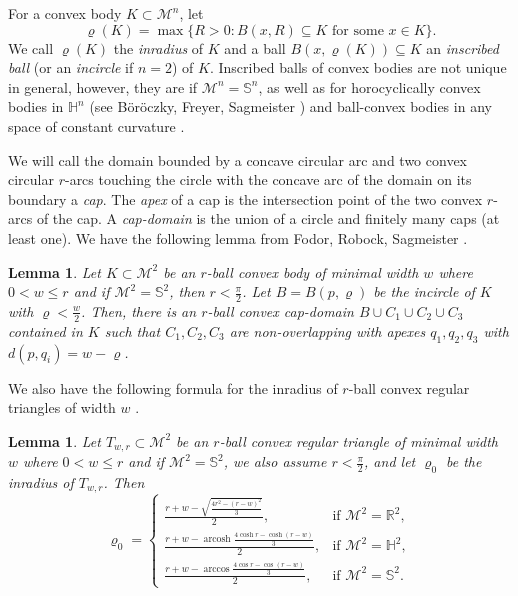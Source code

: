 \documentclass[12pt,reqno]{amsart}
\newtheorem{lemma}[theorem]{Lemma}
\theoremstyle{remark}
\newcommand{\R}{{\mathbb R}}
\newcommand{\hyp}{{\mathbb H}}
\newcommand{\sph}{{\mathbb S}}
\newcommand{\M}{\mathcal{M}}
\DeclareMathOperator{\arcosh}{\mathrm{arcosh}}
\begin{document}
For a convex body $K\subset\M^n$, let
$$
\varrho(K)=\max\{R>0\colon B(x,R)\subseteq K\text{ for some }x\in K\}.
$$
We call $\varrho(K)$ the \emph{inradius} of $K$ and a ball $B(x,\varrho(K))\subseteq K$ an \emph{inscribed ball} (or an \emph{incircle} if $n=2$) of $K$. Inscribed balls of convex bodies are not unique in general, however, they are if $\M^n=\sph^n$, as well as for horocyclically convex bodies in $\hyp^n$ (see B\"or\"oczky, Freyer, Sagmeister \cite{BoFS}) and ball-convex bodies in any space of constant curvature \cite{FRS26}. 

We will call the domain bounded by a concave circular arc and two convex circular $r$-arcs touching the circle with the concave arc of the domain on its boundary a \emph{cap}. The \emph{apex} of a cap is the intersection point of the two convex $r$-arcs of the cap. A \emph{cap-domain} is the union of a circle and finitely many caps (at least one). We have the following lemma from Fodor, Robock, Sagmeister \cite{FRS26}.

\begin{lemma}\label{lem:nonoverlapping}
Let $K\subset\M^2$ be an $r$-ball convex body of minimal width $w$ where $0<w\leq r$ and if $\M^2=\sph^2$, then $r<\frac{\pi}{2}$. Let $B=B(p,\varrho)$ be the incircle of $K$ with $\varrho<\frac{w}{2}$. Then, there is an $r$-ball convex cap-domain $B\cup C_1\cup C_2\cup C_3$ contained in $K$ such that $C_1,C_2,C_3$ are non-overlapping with apexes $q_1,q_2,q_3$ with $d(p,q_i)=w-\varrho$.
\end{lemma}

We also have the following formula for the inradius of $r$-ball convex regular triangles of width $w$ \cite{FRS26}.

\begin{lemma}\label{lem:rho0}
Let $T_{w,r}\subset\M^2$ be an $r$-ball convex regular triangle of minimal width $w$ where $0<w\leq r$ and if $\M^2=\sph^2$, we also assume $r<\frac{\pi}{2}$, and let $\varrho_0$ be the inradius of $T_{w,r}$. Then
\begin{equation}
\varrho_0=
\begin{cases}
\frac{r+w-\sqrt{\tfrac{4r^2-(r-w)^2}{3}}}{2}, &\text{if }\M^2=\R^2,\\
\frac{r+w-\arcosh\tfrac{4\cosh r-\cosh(r-w)}{3}}{2}, &\text{if }\M^2=\hyp^2,\\
\frac{r+w-\arccos\tfrac{4\cos r-\cos(r-w)}{3}}{2}, &\text{if }\M^2=\sph^2.
\end{cases}
\end{equation}
\end{lemma}
\end{document}
